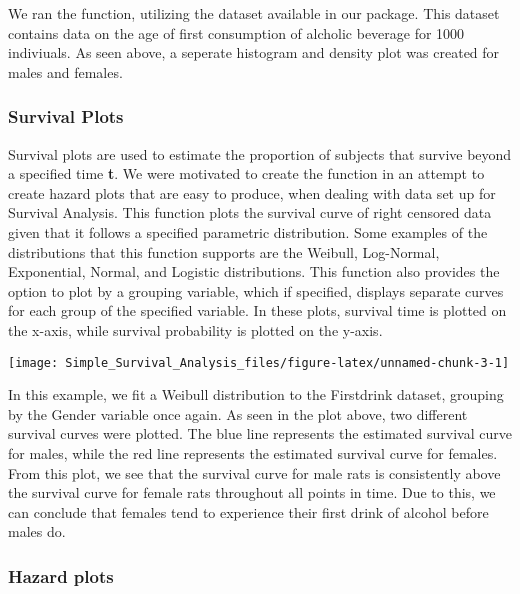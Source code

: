 We ran the  function, utilizing the
 dataset available in our package. This dataset
contains data on the age of first consumption of alcholic beverage for
1000 indiviuals. As seen above, a seperate histogram and density plot
was created for males and females.

\hypertarget{survival-plots}{%
\subsubsection{Survival Plots}\label{survival-plots}}

Survival plots are used to estimate the proportion of subjects that
survive beyond a specified time \textbf{t}. We were motivated to create
the function  in an attempt to create hazard plots that
are easy to produce, when dealing with data set up for Survival
Analysis. This function plots the survival curve of right censored data
given that it follows a specified parametric distribution. Some examples
of the distributions that this function supports are the Weibull,
Log-Normal, Exponential, Normal, and Logistic distributions. This
function also provides the option to plot by a grouping variable, which
if specified, displays separate curves for each group of the specified
variable. In these plots, survival time is plotted on the x-axis, while
survival probability is plotted on the y-axis.

\begin{Schunk}

\texttt{[image: Simple\_Survival\_Analysis\_files/figure-latex/unnamed-chunk-3-1]} \end{Schunk}

In this example, we fit a Weibull distribution to the Firstdrink
dataset, grouping by the Gender variable once again. As seen in the plot
above, two different survival curves were plotted. The blue line
represents the estimated survival curve for males, while the red line
represents the estimated survival curve for females. From this plot, we
see that the survival curve for male rats is consistently above the
survival curve for female rats throughout all points in time. Due to
this, we can conclude that females tend to experience their first drink
of alcohol before males do.

\hypertarget{hazard-plots}{%
\subsubsection{Hazard plots}\label{hazard-plots}}

